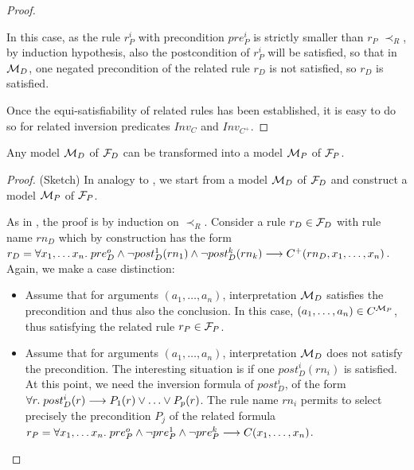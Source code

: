 \begin{proof}
\begin{itemize}
    In this case, as the rule $r_P^i$ with precondition $pre_P^i$ is strictly
    smaller than $r_P$ \wrt{} $\prec_R$, by induction hypothesis, also the
    postcondition of $r_P^i$ will be satisfied, so that in ${\cal M}_D$, one
    negated precondition of the related rule $r_D$ is not satisfied, so $r_D$
    is satisfied.
  \end{itemize}

  Once the equi-satisfiability of related rules has been established, it is
  easy to do so for related inversion predicates $Inv_C$ and $Inv_{C^+}$.
\end{proof}


\begin{proposition}\label{lemma:md_to_mp}
  Any model ${\cal M}_D$ of ${\cal F}_D$ can be transformed into a model
  ${\cal M}_P$ of ${\cal F}_P$.
\end{proposition}

\begin{proof} (Sketch)
  In analogy to , we start from a model ${\cal M}_D$
  of ${\cal F}_D$ and construct a model ${\cal M}_P$ of ${\cal F}_P$. 

  As in , the proof is by induction on $\prec_R$.
  Consider a rule $r_D \in {\cal F}_D$ with rule
  name $rn_D$ which by construction has the form
  $r_D = \forall x_1, \dots x_n.\; pre_D^o \land \lnot post_D^1(rn_1) \land \lnot post_D^k(rn_k)
  \longrightarrow C^+(rn_D, x_1, \dots, x_n)$. Again, we make a case distinction:
  \begin{itemize}
  \item Assume that for arguments $(a_1, \dots, a_n)$, interpretation
    ${\cal M}_D$ satisfies the precondition and thus also the conclusion. In
    this case, $(a_1, \dots, a_n)\in C^{{\cal M}_P}$, thus satisfying the
    related rule $r_P \in {\cal F}_P$.
  \item Assume that for arguments $(a_1, \dots, a_n)$, interpretation
    ${\cal M}_D$ does not satisfy the precondition. The interesting situation
    is if one $post_D^i(rn_i)$ is satisfied. At this point, we need the
    inversion formula of $post_D^i$, of the form
    $\forall r.\; post_D^i(r) \IMPL P_1(r) \OR \dots \OR P_p(r)$. The rule
    name $rn_i$ permits to select precisely the precondition $P_j$ of the
    related formula
    $r_P = \forall x_1, \dots x_n.\; pre_P^o \land \lnot pre_P^1 \land \lnot
    pre_P^k \longrightarrow C(x_1, \dots, x_n)$.
  \end{itemize}
\end{proof}
